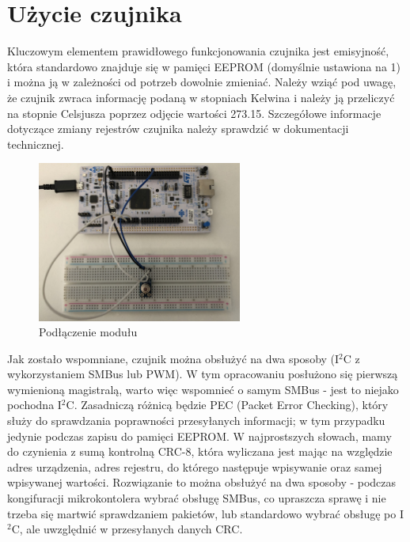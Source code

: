\documentclass[11pt, a4paper]{article}
\begin{document}
\section*{Użycie czujnika}
Kluczowym elementem prawidłowego funkcjonowania czujnika jest emisyjność, która standardowo znajduje się w pamięci EEPROM (domyślnie ustawiona na 1) i można ją w zależności od potrzeb dowolnie zmieniać. Należy wziąć pod uwagę, że czujnik zwraca informację podaną w stopniach Kelwina i należy ją przeliczyć na stopnie Celsjusza poprzez odjęcie wartości 273.15. Szczegółowe informacje dotyczące zmiany rejestrów czujnika należy sprawdzić w dokumentacji technicznej.
\vspace{0.5cm}
\begin{figure}[h!]
    \centering
    \includegraphics[width=0.6\textwidth]{fig/GY-906/polaczenie_modulu/podlaczenie.jpg}
    \caption{Podłączenie modułu}
    \label{fig:my_label}
\end{figure}
\vspace{0.5cm}
\newline
Jak zostało wspomniane, czujnik można obsłużyć na dwa sposoby (I$^{2}$C z wykorzystaniem SMBus lub PWM). W tym opracowaniu posłużono się pierwszą wymienioną magistralą, warto więc wspomnieć o samym SMBus - jest to niejako pochodna I$^{2}$C. Zasadniczą różnicą będzie PEC (Packet Error Checking), który służy do sprawdzania poprawności przesyłanych informacji; w tym przypadku jedynie podczas zapisu do pamięci EEPROM. W najprostszych słowach, mamy do czynienia z sumą kontrolną CRC-8, która wyliczana jest mając na względzie adres urządzenia, adres rejestru, do którego następuje wpisywanie oraz samej wpisywanej wartości. Rozwiązanie to można obsłużyć na dwa sposoby - podczas kongifuracji mikrokontolera wybrać obsługę SMBus, co upraszcza sprawę i nie trzeba się martwić sprawdzaniem pakietów, lub standardowo wybrać obsługę po I$^{2}$C, ale uwzględnić w przesyłanych danych CRC.
\vspace{0.5cm}
\end{document}
